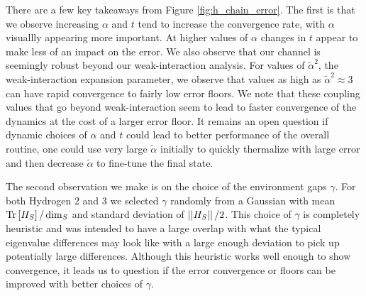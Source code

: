 There are a few key takeaways from Figure \ref{fig:h_chain_error}. The first is that we observe increasing $\alpha$ and $t$ tend to increase the convergence rate, with $\alpha$ visuallly appearing more important. At higher values of $\alpha$ changes in $t$ appear to make less of an impact on the error. We also observe that our channel is seemingly robust beyond our weak-interaction analysis. For values of $\widetilde{\alpha}^2$, the weak-interaction expansion parameter, we observe that values as high as $\widetilde{\alpha}^2 \approx 3$ can have rapid convergence to fairly low error floors. We note that these coupling values that go beyond weak-interaction seem to lead to faster convergence of the dynamics at the cost of a larger error floor. It remains an open question if dynamic choices of $\alpha$ and $t$ could lead to better performance of the overall routine, one could use very large $\widetilde{\alpha}$ initially to quickly thermalize with large error and then decrease $\widetilde{\alpha}$ to fine-tune the final state.

The second observation we make is on the choice of the environment gaps $\gamma$. For both Hydrogen 2 and 3 we selected $\gamma $ randomly from a Gaussian with mean $\operatorname{Tr} \left[  H_S  \right] / \dim_S$ and standard deviation of $\left| \left| H_S \right| \right| / 2$. This choice of $\gamma$ is completely heuristic and was intended to have a large overlap with what the typical eigenvalue differences may look like with a large enough deviation to pick up potentially large differences. Although this heuristic works well enough to show convergence, it leads us to question if the error convergence or floors can be improved with better choices of $\gamma$. 

